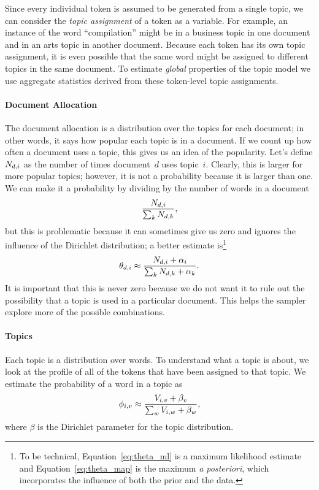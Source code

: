 Since every individual token is assumed to be generated from a single topic,
we can consider the {\em topic assignment} of a token as a variable.  For example,
an instance of the word ``compilation'' might be in a business topic in one
document and in an arts topic in another document.  Because each token has its own
topic assignment, it is even possible that the
same word might be assigned to different topics in the same document.
To estimate \emph{global} properties of the topic model we use aggregate statistics derived from these token-level topic assignments.

\paragraph{Document Allocation} The document allocation is a distribution over
the topics for each document; in other words, it says how popular each topic is
in a document.  If we count up how often a document uses a topic, this gives us
an idea of the popularity.  Let's define $N_{d,i}$ as the number of times
document~$d$ uses topic~$i$.  Clearly, this is larger for more popular topics;
however, it is not a probability because it is larger than one.  We can make it a
probability by dividing by the number of words in a document
\begin{equation}
\frac{N_{d,i}}{\sum_k N_{d,k}},
\label{eq:theta_ml}
\end{equation}
but this is problematic because it can sometimes give us zero and ignores the
influence of the Dirichlet distribution; a better estimate is\footnote{To be
  technical, Equation~\ref{eq:theta_ml} is a maximum likelihood estimate and
  Equation~\ref{eq:theta_map} is the maximum \textit{a posteriori}, which
  incorporates the influence of both the prior and the data.}
\begin{equation}
\theta_{d,i} \approx \frac{N_{d,i} + \alpha_i}{\sum_k N_{d,k} + \alpha_k}.
\label{eq:theta_map}
\end{equation}
It is important that this is never zero because we do not want it to rule out the possibility
that a topic is used in a particular document.  This helps the sampler
explore more of the possible combinations.

\paragraph{Topics}

Each topic is a distribution over words.  To understand what a topic is about,
we look at the profile of all of the tokens that have been assigned to that
topic.  We estimate the probability of a word in a topic as
\begin{equation}
\phi_{i,v} \approx \frac{V_{i,v} + \beta_v}{\sum_w V_{i,w} + \beta_w},
\label{eq:phi_map}
\end{equation}
where $\beta$ is the Dirichlet parameter for the topic distribution.

